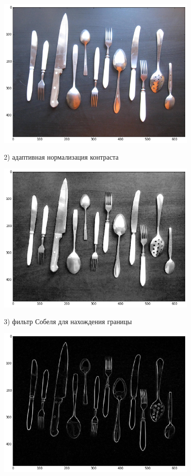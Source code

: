 \documentclass[12pt, a4paper]{article}
\begin{document}
            \begin{center}
                \includegraphics[width=10cm]{1.png}
            \end{center}

            2) адаптивная нормализация контраста
            \begin{center}
                \includegraphics[width=10cm]{2.png}
            \end{center}

            3) фильтр Собеля для нахождения границы
            \begin{center}
                \includegraphics[width=10cm]{3.png}
            \end{center}
\end{document}
